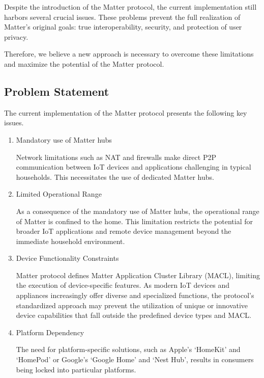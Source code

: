 \documentclass[conference]{IEEEtran}
\begin{document}
Despite the introduction of the Matter protocol, the current implementation still
harbors several crucial issues. These problems prevent the full realization of
Matter's original goals: true interoperability, security, and protection of user
privacy.

Therefore, we believe a new approach is necessary to overcome these
limitations and maximize the potential of the Matter protocol.

\subsection{Problem Statement}
The current implementation of the Matter protocol presents the following key
issues.
\begin{enumerate}[itemsep=2ex, parsep=1ex]
	\item Mandatory use of Matter hubs
	      	      	      
	      Network limitations such as NAT and firewalls make direct P2P
	      communication between IoT devices and applications challenging in typical
	      households. This necessitates the use of dedicated Matter hubs.
	      	      	      
	\item Limited Operational Range
	      	      	      
	      As a consequence of the mandatory use of Matter hubs, the operational range
	      of Matter is confined to the home. This limitation restricts the potential
	      for broader IoT applications and remote device management beyond the
	      immediate household environment.
	      	      	      
	\item Device Functionality Constraints
	      	      	                  
	      Matter protocol defines Matter Application Cluster Library (MACL), limiting the execution of device-specific features. As modern IoT devices and appliances increasingly offer diverse and specialized functions, the protocol's standardized approach may prevent the utilization of unique or innovative device capabilities that fall outside the predefined device types and MACL.
	      	      	      
	\item Platform Dependency
	      	      	      
	      The need for platform-specific solutions, such as Apple's `HomeKit' and `HomePod'
	      or Google's `Google Home' and `Nest Hub', results in consumers being
	      locked into particular platforms.
	      	      	      

\end{enumerate}
\end{document}
